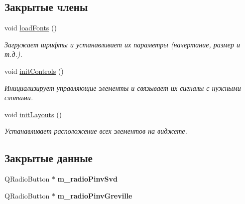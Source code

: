 \subsection*{Закрытые члены}
\begin{DoxyCompactItemize}
\item 
void \hyperlink{class_additional_settings_widget_aaa678b544facc924f555b15e5640b21a}{load\+Fonts} ()
\begin{DoxyCompactList}\small\item\em Загружает шрифты и устанавливает их параметры (начертание, размер и т.\+д.). \end{DoxyCompactList}\item 
\hypertarget{class_additional_settings_widget_a19a4de8c860475245e1719e0bdf20a4f}{}\label{class_additional_settings_widget_a19a4de8c860475245e1719e0bdf20a4f} 
void \hyperlink{class_additional_settings_widget_a19a4de8c860475245e1719e0bdf20a4f}{init\+Controls} ()
\begin{DoxyCompactList}\small\item\em Инициализирует управляющие элементы и связывает их сигналы с нужными слотами. \end{DoxyCompactList}\item 
\hypertarget{class_additional_settings_widget_a60b77ac98c1d0737876007c01473badd}{}\label{class_additional_settings_widget_a60b77ac98c1d0737876007c01473badd} 
void \hyperlink{class_additional_settings_widget_a60b77ac98c1d0737876007c01473badd}{init\+Layouts} ()
\begin{DoxyCompactList}\small\item\em Устанавливает расположение всех элементов на виджете. \end{DoxyCompactList}\end{DoxyCompactItemize}
\subsection*{Закрытые данные}
\begin{DoxyCompactItemize}
\item 
\hypertarget{class_additional_settings_widget_a9e63a721e6abd5aec1465c1a256e459a}{}\label{class_additional_settings_widget_a9e63a721e6abd5aec1465c1a256e459a} 
Q\+Radio\+Button $\ast$ {\bfseries m\+\_\+radio\+Pinv\+Svd}
\item 
\hypertarget{class_additional_settings_widget_aed3b5d9090f100a2ba5cd41cbf58c90a}{}\label{class_additional_settings_widget_aed3b5d9090f100a2ba5cd41cbf58c90a} 
Q\+Radio\+Button $\ast$ {\bfseries m\+\_\+radio\+Pinv\+Greville}
\end{DoxyCompactItemize}


